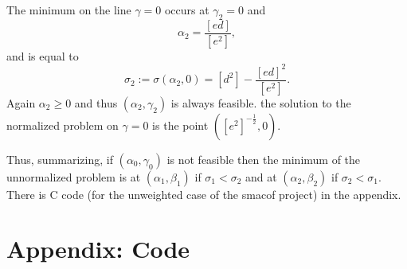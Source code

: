 \documentclass[
  12pt,
]{article}
\begin{document}
The minimum on the line \(\gamma=0\) occurs at \(\gamma_2=0\) and
\begin{equation}
\alpha_2=\frac{[ed]}{[e^2]},
\end{equation}
and is equal to \begin{equation}
\sigma_2:=\sigma(\alpha_2,0)=[d^2]-\frac{[ed]^2}{[e^2]}.
\end{equation}
Again \(\alpha_2\geq 0\) and thus \((\alpha_2,\gamma_2)\) is always feasible.
the solution to the normalized problem on \(\gamma=0\) is the point
\(([e^2]^{-\frac12}, 0)\).

Thus, summarizing, if \((\alpha_0,\gamma_0)\) is not feasible then the
minimum of the unnormalized problem is at \((\alpha_1,\beta_1)\)
if \(\sigma_1<\sigma_2\) and at
\((\alpha_2,\beta_2)\) if \(\sigma_2<\sigma_1\). There is C code (for the
unweighted case of the smacof project) in the appendix.

\section{Appendix: Code}\label{appendix-code}
\end{document}
